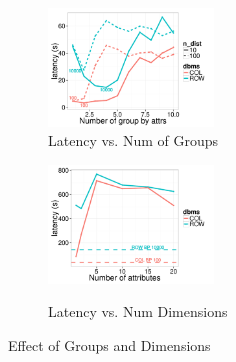 \begin{figure}[h]
	\centering
	\vspace*{-10pt}
	\begin{subfigure}{0.48\linewidth}
		\centering
		\includegraphics[width=4.4cm] {Images/multi_gb_same.pdf}
		\vspace{-15pt}
		\caption{Latency vs. Num of Groups}
		\label{fig:multi_gb_same}
	\end{subfigure}
	\begin{subfigure}{0.48\linewidth}
		\centering
		\includegraphics[width=4.4cm] {Images/multi_gb.pdf}\
		\vspace{-15pt}
		\caption{Latency vs. Num Dimensions}
		\label{fig:multi_gb_bp}
	\end{subfigure}
	\vspace{-10pt}
	\caption{Effect of Groups and Dimensions}
	\vspace{-15pt}
\end{figure}




